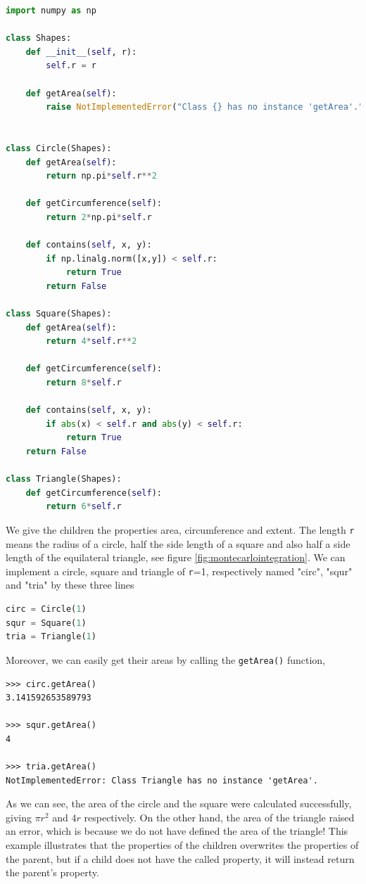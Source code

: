 \lstset{basicstyle=\scriptsize}
\begin{lstlisting}[language=python, caption={Geometric shapes implemented in object-oriented Python.}, label={lst:python}]
import numpy as np

class Shapes:
	def __init__(self, r):
		self.r = r

	def getArea(self):
		raise NotImplementedError("Class {} has no instance 'getArea'.".format(self.__class__.__name__))


class Circle(Shapes):
	def getArea(self):
		return np.pi*self.r**2

	def getCircumference(self):
		return 2*np.pi*self.r

	def contains(self, x, y):
		if np.linalg.norm([x,y]) < self.r:
			return True
		return False

class Square(Shapes):
	def getArea(self):
		return 4*self.r**2

	def getCircumference(self):
		return 8*self.r

	def contains(self, x, y):
		if abs(x) < self.r and abs(y) < self.r:
			return True
	return False

class Triangle(Shapes):
	def getCircumference(self):
		return 6*self.r
\end{lstlisting}
We give the children the properties area, circumference and extent. The length \texttt{r} means the radius of a circle, half the side length of a square and also half a side length of the equilateral triangle, see figure \eqref{fig:montecarlointegration}. We can implement a circle, square and triangle of \texttt{r}=1, respectively named "circ", "squr" and "tria" by these three lines
\lstset{basicstyle=\scriptsize}
\begin{lstlisting}[language=python]
circ = Circle(1)
squr = Square(1)
tria = Triangle(1)
\end{lstlisting}
Moreover, we can easily get their areas by calling the \texttt{getArea()} function,
\lstset{basicstyle=\scriptsize}
\begin{lstlisting}
>>> circ.getArea()
3.141592653589793

>>> squr.getArea()
4

>>> tria.getArea()
NotImplementedError: Class Triangle has no instance 'getArea'.
\end{lstlisting}

As we can see, the area of the circle and the square were calculated successfully, giving $\pi r^2$ and $4r$ respectively. On the other hand, the area of the triangle raised an error, which is because we do not have defined the area of the triangle! This example illustrates that the properties of the children overwrites the properties of the parent, but if a child does not have the called property, it will instead return the parent's property. 

